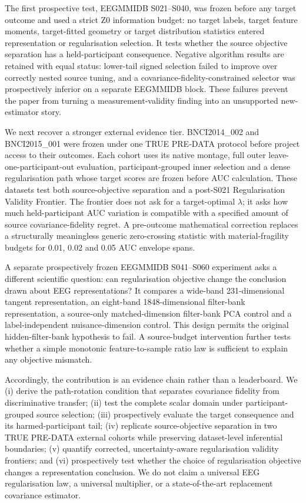 The first prospective test, EEGMMIDB S021--S040, was frozen before any target
outcome and used a strict Z0 information budget: no target labels, target
feature moments, target-fitted geometry or target distribution statistics
entered representation or regularisation selection. It tests whether the
source objective separation has a held-participant consequence. Negative
algorithm results are retained with equal status: lower-tail signed selection
failed to improve over correctly nested source tuning, and a
covariance-fidelity-constrained selector was prospectively inferior on a
separate EEGMMIDB block. These failures prevent the paper from turning a
measurement-validity finding into an unsupported new-estimator story.

We next recover a stronger external evidence tier. BNCI2014\_002 and
BNCI2015\_001 were frozen under one TRUE PRE-DATA protocol before project
access to their outcomes. Each cohort uses its native montage, full outer
leave-one-participant-out evaluation, participant-grouped inner selection and a
dense regularisation path whose target scores are frozen before AUC
calculation. These datasets test both source-objective separation and a
post-S021 Regularisation Validity Frontier. The frontier does not ask for a
target-optimal \(\lambda\); it asks how much held-participant AUC variation
is compatible with a specified amount of source covariance-fidelity regret.
A pre-outcome mathematical correction replaces a structurally meaningless
generic zero-crossing statistic with material-fragility budgets for 0.01,
0.02 and 0.05 AUC envelope spans.

A separate prospectively frozen EEGMMIDB S041--S060 experiment asks a
different scientific question: can regularisation objective change the
conclusion drawn about EEG representations? It compares a wide-band
231-dimensional tangent representation, an eight-band 1848-dimensional
filter-bank representation, a source-only matched-dimension filter-bank PCA
control and a label-independent nuisance-dimension control. This design
permits the original hidden-filter-bank hypothesis to fail. A source-budget
intervention further tests whether a simple monotonic feature-to-sample ratio
law is sufficient to explain any objective mismatch.

Accordingly, the contribution is an evidence chain rather than a leaderboard.
We (i) derive the path-rotation condition that separates covariance fidelity
from discriminative transfer; (ii) test the complete scalar domain under
participant-grouped source selection; (iii) prospectively evaluate the target
consequence and its harmed-participant tail; (iv) replicate source-objective
separation in two TRUE PRE-DATA external cohorts while preserving
dataset-level inferential boundaries; (v) quantify corrected, uncertainty-aware
regularisation validity frontiers; and (vi) prospectively test whether the
choice of regularisation objective changes a representation conclusion. We do
not claim a universal EEG regularisation law, a universal multiplier, or a
state-of-the-art replacement covariance estimator.
